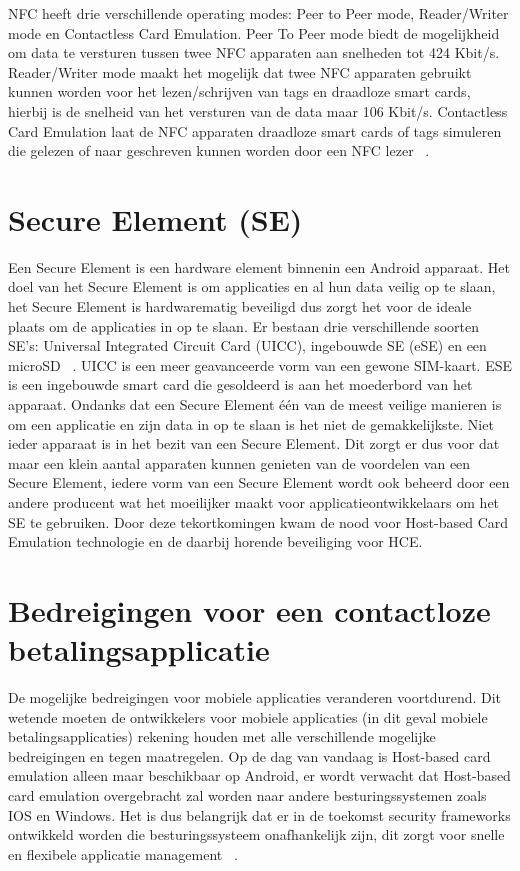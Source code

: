 NFC heeft drie verschillende operating modes: Peer to Peer mode, Reader/Writer mode en Contactless Card Emulation. Peer To Peer mode biedt de mogelijkheid om data te versturen tussen twee NFC apparaten aan snelheden tot 424 Kbit/s. Reader/Writer mode maakt het mogelijk dat twee NFC apparaten gebruikt kunnen worden voor het lezen/schrijven van tags en draadloze smart cards, hierbij is de snelheid van het versturen van de data maar 106 Kbit/s. Contactless Card Emulation laat de NFC apparaten draadloze smart cards of tags simuleren die gelezen of naar geschreven kunnen worden door een NFC lezer ~\autocite{Alattar2014}. 


\section{Secure Element (SE)}
\label{sec:SE}
Een Secure Element is een hardware element binnenin een Android apparaat. Het doel van het Secure Element is om applicaties en al hun data veilig op te slaan, het Secure Element is hardwarematig beveiligd dus zorgt het voor de ideale plaats om de applicaties in op te slaan. Er bestaan drie verschillende soorten SE's: Universal Integrated Circuit Card (UICC), ingebouwde SE (eSE) en een microSD ~\autocite{Borko2014}. UICC is een meer geavanceerde vorm van een gewone SIM-kaart. ESE is een ingebouwde smart card die gesoldeerd is aan het moederbord van het apparaat. Ondanks dat een Secure Element één van de meest veilige manieren is om een applicatie en zijn data in op te slaan is het niet de gemakkelijkste. Niet ieder apparaat is in het bezit van een Secure Element. Dit zorgt er dus voor dat maar een klein aantal apparaten kunnen genieten van de voordelen van een Secure Element, iedere vorm van een Secure Element wordt ook beheerd door een andere producent wat het moeilijker maakt voor applicatieontwikkelaars om het SE te gebruiken. Door deze tekortkomingen kwam de nood voor Host-based Card Emulation technologie en de daarbij horende beveiliging voor HCE.


\section{Bedreigingen voor een contactloze betalingsapplicatie}
\label{sec:Bedreigingen}
De mogelijke bedreigingen voor mobiele applicaties veranderen voortdurend. Dit wetende moeten de ontwikkelers voor mobiele applicaties (in dit geval mobiele betalingsapplicaties) rekening houden met alle verschillende mogelijke bedreigingen en tegen maatregelen. Op de dag van vandaag is Host-based card emulation alleen maar beschikbaar op Android, er wordt verwacht dat Host-based card emulation overgebracht zal worden naar andere besturingssystemen zoals IOS en Windows. Het is dus belangrijk dat er in de toekomst security frameworks ontwikkeld worden die besturingssysteem onafhankelijk zijn, dit zorgt voor snelle en flexibele applicatie management ~\autocite{Cryptomathic}.

